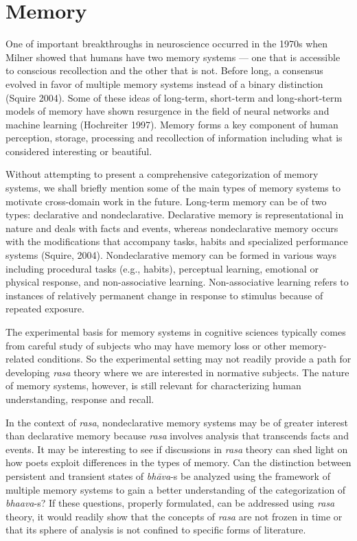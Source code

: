 \section*{Memory}

One of important breakthroughs in neuroscience occurred in the 1970s when Milner showed that humans have two memory systems --- one that is accessible to conscious recollection and the other that is not. Before long, a consensus evolved in favor of multiple memory systems instead of a binary distinction (Squire 2004). Some of these ideas of long-term, short-term and long-short-term models of memory have shown resurgence in the field of neural networks and machine learning (Hochreiter 1997). Memory forms a key component of human perception, storage, processing and recollection of information including what is considered interesting or beautiful. 

Without attempting to present a comprehensive categorization of memory systems, we shall briefly mention some of the main types of memory systems to motivate cross-domain work in the future. Long-term memory can be of two types: declarative and nondeclarative. Declarative memory is representational in nature and deals with facts and events, whereas nondeclarative memory occurs with the modifications that accompany tasks, habits and specialized performance systems (Squire, 2004). Nondeclarative memory can be formed in various ways including procedural tasks (e.g., habits), perceptual learning, emotional or physical response, and non-associative learning. Non-associative learning refers to instances of relatively permanent change in response to stimulus because of repeated exposure. 

The experimental basis for memory systems in cognitive sciences typically comes from careful study of subjects who may have memory loss or other memory-related conditions. So the experimental setting may not readily provide a path for developing \textsl{rasa} theory where we are interested in normative subjects. The nature of memory systems, however, is still relevant for characterizing human understanding, response and recall.

In the context of \textsl{rasa}, nondeclarative memory systems may be of greater interest than declarative memory because \textsl{rasa} involves analysis that transcends facts and events. It may be interesting to see if discussions in \textsl{rasa} theory can shed light on how poets exploit differences in the types of memory. Can the distinction between persistent and transient states of \textsl{bhāva}-s be analyzed using the framework of multiple memory systems to gain a better understanding of the categorization of \textsl{bhaava}-s? If these questions, properly formulated, can be addressed using \textsl{rasa} theory, it would readily show that the concepts of \textsl{rasa} are not frozen in time or that its sphere of analysis is not confined to specific forms of literature.

